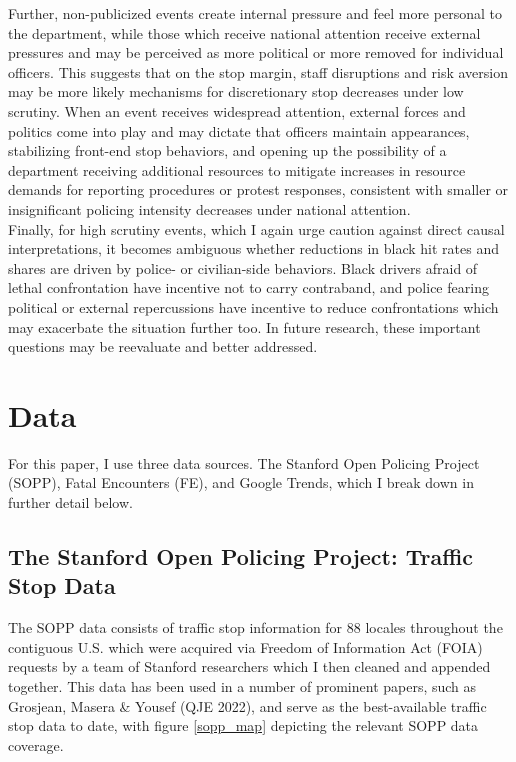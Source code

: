 \documentclass[12pt,a4paper]{article}
\begin{document}
Further, non-publicized events create internal pressure and feel more personal to the department, while those which receive national attention receive external pressures and may be perceived as more political or more removed for individual officers. This suggests that on the stop margin, staff disruptions and risk aversion may be more likely mechanisms for discretionary stop decreases under low scrutiny. When an event receives widespread attention, external forces and politics come into play and may dictate that officers maintain appearances, stabilizing front-end stop behaviors, and opening up the possibility of a department receiving additional resources to mitigate increases in resource demands for reporting procedures or protest responses, consistent with smaller or insignificant policing intensity decreases under national attention. \\

Finally, for high scrutiny events, which I again urge caution against direct causal interpretations, it becomes ambiguous whether reductions in black hit rates and shares are driven by police- or civilian-side behaviors. Black drivers afraid of lethal confrontation have incentive not to carry contraband, and police fearing political or external repercussions have incentive to reduce confrontations which may exacerbate the situation further too. In future research, these important questions may be reevaluate and better addressed. \\

\section{Data}
For this paper, I use three data sources. The Stanford Open Policing Project (SOPP), Fatal Encounters (FE), and Google Trends, which I break down in further detail below. \\

\subsection{The Stanford Open Policing Project: Traffic Stop Data}
The SOPP data consists of traffic stop information for 88 locales throughout the contiguous U.S. which were acquired via Freedom of Information Act (FOIA) requests by a team of Stanford researchers which I then cleaned and appended together. This data has been used in a number of prominent papers, such as Grosjean, Masera \& Yousef (QJE 2022), and serve as the best-available traffic stop data to date, with figure \ref{sopp_map} depicting the relevant SOPP data coverage. \\
\end{document}
